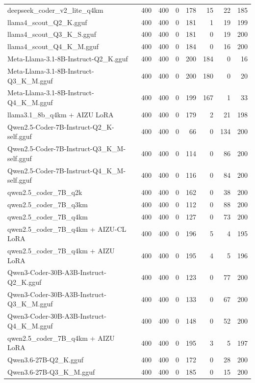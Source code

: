 \begin{table}[htbp]
{\begin{tabular}{lrrrrrrr}
    deepseek\_coder\_v2\_lite\_q4km & 400 & 400 & 0 & 178 & 15 & 22 & 185 \\
    llama4\_scout\_Q2\_K.gguf & 400 & 400 & 0 & 181 & 1 & 19 & 199 \\
    llama4\_scout\_Q3\_K\_S.gguf & 400 & 400 & 0 & 181 & 0 & 19 & 200 \\
    llama4\_scout\_Q4\_K\_M.gguf & 400 & 400 & 0 & 184 & 0 & 16 & 200 \\
    Meta-Llama-3.1-8B-Instruct-Q2\_K.gguf & 400 & 400 & 0 & 200 & 184 & 0 & 16 \\
    Meta-Llama-3.1-8B-Instruct-Q3\_K\_M.gguf & 400 & 400 & 0 & 200 & 180 & 0 & 20 \\
    Meta-Llama-3.1-8B-Instruct-Q4\_K\_M.gguf & 400 & 400 & 0 & 199 & 167 & 1 & 33 \\
    llama3.1\_8b\_q4km + AIZU LoRA & 400 & 400 & 0 & 179 & 2 & 21 & 198 \\
    Qwen2.5-Coder-7B-Instruct-Q2\_K-self.gguf & 400 & 400 & 0 & 66 & 0 & 134 & 200 \\
    Qwen2.5-Coder-7B-Instruct-Q3\_K\_M-self.gguf & 400 & 400 & 0 & 114 & 0 & 86 & 200 \\
    Qwen2.5-Coder-7B-Instruct-Q4\_K\_M-self.gguf & 400 & 400 & 0 & 116 & 0 & 84 & 200 \\
    qwen2.5\_coder\_7B\_q2k & 400 & 400 & 0 & 162 & 0 & 38 & 200 \\
    qwen2.5\_coder\_7B\_q3km & 400 & 400 & 0 & 112 & 0 & 88 & 200 \\
    qwen2.5\_coder\_7B\_q4km & 400 & 400 & 0 & 127 & 0 & 73 & 200 \\
    qwen2.5\_coder\_7B\_q4km + AIZU-CL LoRA & 400 & 400 & 0 & 196 & 5 & 4 & 195 \\
    qwen2.5\_coder\_7B\_q4km + AIZU LoRA & 400 & 400 & 0 & 195 & 4 & 5 & 196 \\
    Qwen3-Coder-30B-A3B-Instruct-Q2\_K.gguf & 400 & 400 & 0 & 123 & 0 & 77 & 200 \\
    Qwen3-Coder-30B-A3B-Instruct-Q3\_K\_M.gguf & 400 & 400 & 0 & 133 & 0 & 67 & 200 \\
    Qwen3-Coder-30B-A3B-Instruct-Q4\_K\_M.gguf & 400 & 400 & 0 & 148 & 0 & 52 & 200 \\
    qwen2.5\_coder\_7B\_q4km + AIZU LoRA & 400 & 400 & 0 & 195 & 3 & 5 & 197 \\
    Qwen3.6-27B-Q2\_K.gguf & 400 & 400 & 0 & 172 & 0 & 28 & 200 \\
    Qwen3.6-27B-Q3\_K\_M.gguf & 400 & 400 & 0 & 185 & 0 & 15 & 200 \\

\end{tabular}}
\end{table}
